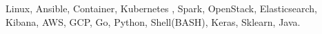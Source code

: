 

\begin{cvparagraph}

Linux, Ansible, Container, Kubernetes , Spark, OpenStack, Elasticsearch, Kibana, AWS, GCP, Go, Python, Shell(BASH), Keras, Sklearn, Java.
\end{cvparagraph}
